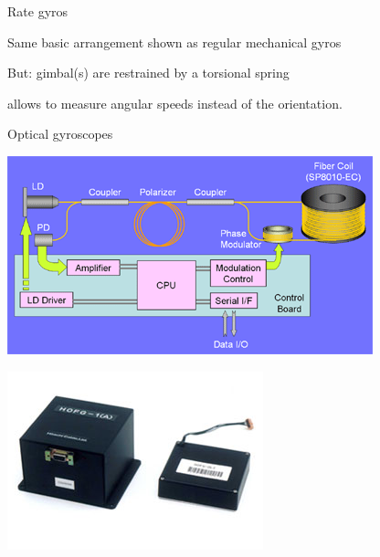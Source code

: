 \documentclass[compress]{beamer}
\begin{document}

\begin{frame}{Rate gyros}

    Same basic arrangement shown as regular mechanical gyros

    But: gimbal(s) are restrained by a torsional spring

    \begin{exampleblock}{}
        allows to measure angular speeds instead of the orientation.
    \end{exampleblock}

\end{frame}

\begin{frame}{Optical gyroscopes}

    \begin{multicols}{2}

        \begin{center}
            \includegraphics[width=0.9\linewidth]{optical-gyro}
        \end{center}

        \begin{center}
            \includegraphics[width=0.7\linewidth]{optical-gyro2}
        \end{center}


\end{multicols}
\end{frame}
\end{document}
